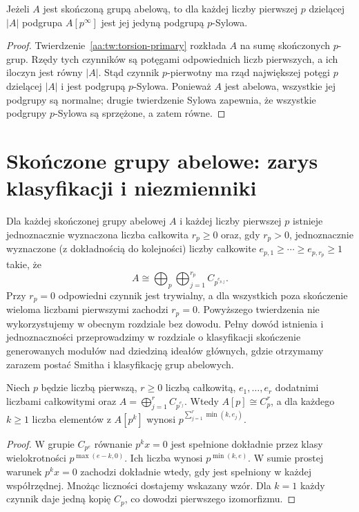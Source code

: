 \begin{wniosek}
\label{aa:wn:abelian-sylow}
Jeżeli $A$ jest skończoną grupą abelową, to dla każdej
liczby pierwszej $p$ dzielącej $|A|$ podgrupa $A[p^\infty]$
jest jej jedyną podgrupą $p$-Sylowa.
\end{wniosek}
\begin{proof}
Twierdzenie~\ref{aa:tw:torsion-primary} rozkłada $A$
na sumę skończonych $p$-grup. Rzędy tych czynników są
potęgami odpowiednich liczb pierwszych, a ich iloczyn
jest równy $|A|$. Stąd czynnik $p$-pierwotny ma rząd
największej potęgi $p$ dzielącej $|A|$ i jest podgrupą
$p$-Sylowa. Ponieważ $A$ jest abelowa, wszystkie jej podgrupy
są normalne; drugie twierdzenie Sylowa zapewnia, że
wszystkie podgrupy $p$-Sylowa są sprzężone, a zatem równe.
\end{proof}

\section{Skończone grupy abelowe: zarys klasyfikacji i niezmienniki}
\begin{uwaga}
\label{aa:tw:finite-abelian-classification}
Dla każdej skończonej grupy abelowej $A$ i każdej liczby
pierwszej $p$ istnieje jednoznacznie wyznaczona liczba całkowita
$r_p\ge0$ oraz, gdy $r_p>0$, jednoznacznie wyznaczone
(z dokładnością do kolejności) liczby całkowite
$e_{p,1}\ge\cdots\ge e_{p,r_p}\ge1$ takie, że
\[
A\cong\bigoplus_p\bigoplus_{j=1}^{r_p}C_{p^{e_{p,j}}}.
\]
Przy $r_p=0$ odpowiedni czynnik jest trywialny, a dla wszystkich
poza skończenie wieloma liczbami pierwszymi zachodzi $r_p=0$.
Powyższego twierdzenia nie wykorzystujemy w obecnym rozdziale
bez dowodu. Pełny dowód istnienia i jednoznaczności przeprowadzimy
w rozdziale o klasyfikacji skończenie generowanych
modułów nad dziedziną ideałów głównych, gdzie otrzymamy
zarazem postać Smitha i klasyfikację grup abelowych.
\end{uwaga}

\begin{lemat}
\label{aa:lem:abelian-p-rank}
Niech $p$ będzie liczbą pierwszą, $r\ge0$ liczbą całkowitą,
$e_1,\ldots,e_r$ dodatnimi liczbami całkowitymi oraz
$A=\bigoplus_{j=1}^r C_{p^{e_j}}$.
Wtedy $A[p]\cong C_p^r$, a dla każdego $k\ge1$
liczba elementów z $A[p^k]$ wynosi
$p^{\sum_{j=1}^r\min(k,e_j)}$.
\end{lemat}
\begin{proof}
W grupie $C_{p^{e}}$ równanie $p^k x=0$ jest spełnione
dokładnie przez klasy wielokrotności $p^{\max(e-k,0)}$.
Ich liczba wynosi $p^{\min(k,e)}$.
W sumie prostej warunek $p^k x=0$ zachodzi dokładnie wtedy,
gdy jest spełniony w każdej współrzędnej. Mnożąc liczności
dostajemy wskazany wzór. Dla $k=1$ każdy czynnik daje
jedną kopię $C_p$, co dowodzi pierwszego izomorfizmu.
\end{proof}

